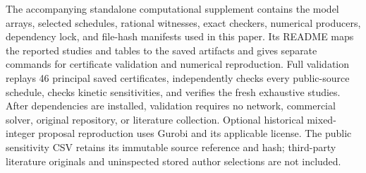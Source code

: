 The accompanying standalone computational supplement contains the model arrays,
selected schedules, rational witnesses, exact checkers, numerical producers,
dependency lock, and file-hash manifests used in this paper. Its README maps
the reported studies and tables to the saved artifacts and gives separate
commands for certificate validation and numerical reproduction. Full validation
replays 46 principal saved certificates, independently checks every public-source
schedule, checks kinetic sensitivities, and verifies the fresh exhaustive
studies. After dependencies are installed, validation requires no network,
commercial solver, original repository, or literature collection. Optional
historical mixed-integer proposal reproduction uses Gurobi and its applicable
license. The public sensitivity CSV retains its immutable source reference
\citep{MeasurementOpt2025} and hash; third-party literature originals and
uninspected stored author selections are not included.
